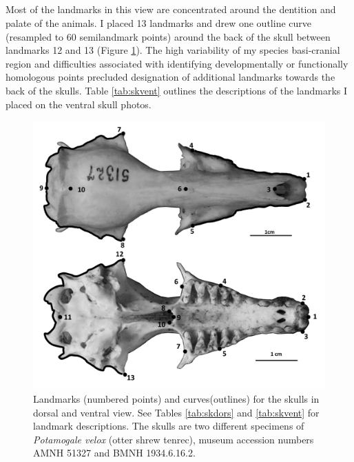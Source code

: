 \subsection{}

	Most of the landmarks in this view are concentrated around the dentition and palate of the animals. I placed 13 landmarks and drew one outline curve (resampled to 60 semilandmark points) around the back of the skull between landmarks 12 and 13 (Figure \ref{fig:skdors_skvent}). The high variability of my species basi-cranial region and difficulties associated with identifying developmentally or functionally homologous points precluded designation of additional landmarks towards the back of the skulls. Table \ref{tab:skvent} outlines the descriptions of the landmarks I placed on the ventral skull photos.


\begin{figure}[!htbp]
	\centering
	\includegraphics[width=1\linewidth]{Methods/figures/Skdors+Skvent_combined_BW.png}
	\caption[Skulls: dorsal and ventral landmarks]
	{Landmarks (numbered points) and curves(outlines) for the skulls in dorsal and ventral view. See Tables \ref{tab:skdors} and \ref{tab:skvent} for landmark descriptions. The skulls are two different specimens of \textit{Potamogale velox} (otter shrew tenrec), museum accession numbers AMNH 51327 and BMNH 1934.6.16.2. }
	\label{fig:skdors_skvent}
\end{figure}


